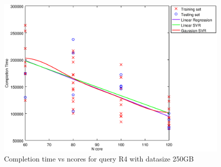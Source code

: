 
\begin {figure}[hbtp]
\centering
\includegraphics[width=\textwidth]{output/R4_250_ONLY_1_LINEAR_NCORE/plot_R4_250_bestmodels.eps}
\caption{Completion time vs ncores for query R4 with datasize 250GB}
\label{fig:only_1_linear_R4_250}
\end {figure}
